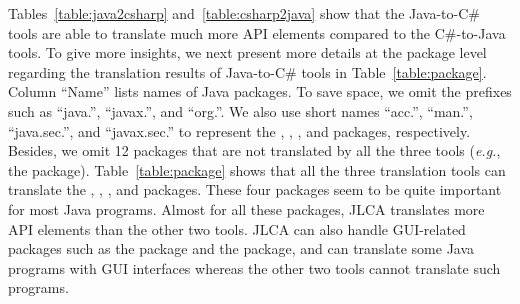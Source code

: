 Tables~\ref{table:java2csharp} and~\ref{table:csharp2java} show that the Java-to-C\# tools are able to translate much more API elements compared to the C\#-to-Java tools. To give more insights, we next present more details at the package level regarding the translation results of Java-to-C\# tools in Table~\ref{table:package}. Column ``Name'' lists names of Java packages. To save space, we omit the prefixes such as ``java.'', ``javax.'', and ``org.''. We also use short names ``acc.'', ``man.'', ``java.sec.'', and ``javax.sec.'' to represent the , , , and  packages, respectively. Besides, we omit 12 packages that are not translated by all the three tools (\emph{e.g.}, the  package). Table~\ref{table:package} shows that all the three translation tools can translate the , , , and  packages. These four packages seem to be quite important for most Java programs. Almost for all these packages, JLCA translates more API elements than the other two tools. JLCA can also handle GUI-related packages such as the  package and the  package, and can translate some Java programs with GUI interfaces whereas the other two tools cannot translate such programs.


